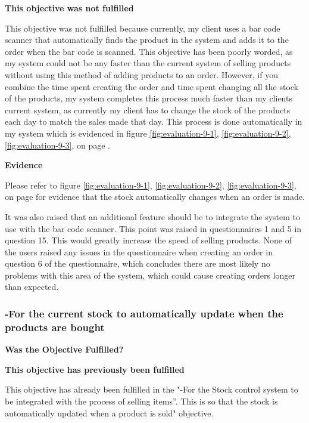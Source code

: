 \textbf{\large{This objective was not fulfilled}}

This objective was not fulfilled because currently, my client uses a bar code scanner that automatically finds the product in the system and adds it to the order when the bar code is scanned. This objective has been poorly worded, as my system could not be any faster than the current system of selling products without using this method of adding products to an order. However, if you combine the time spent creating the order and time spent changing all the stock of the products, my system completes this process much faster than my clients current system, as currently my client has to change the stock of the products each day to match the sales made that day. This process is done automatically in my system which is evidenced in figure \ref{fig:evaluation-9-1}, \ref{fig:evaluation-9-2}, \ref{fig:evaluation-9-3}, on  page \pageref{automatic-stock-evidence}. \newline

\textbf{Evidence} \newline

Please refer to figure \ref{fig:evaluation-9-1}, \ref{fig:evaluation-9-2}, \ref{fig:evaluation-9-3}, on  page \pageref{automatic-stock-evidence} for evidence that the stock automatically changes when an order is made.

It was also raised that an additional feature should be to integrate the system to use with the bar code scanner. This point was raised in questionnaires 1 and 5 in question 15. This would greatly increase the speed of selling products. None of the users raised any issues in the questionnaire when creating an order in question 6 of the questionnaire, which concludes there are most likely no problems with this area of the system, which could cause creating orders longer than expected.




\pagebreak
\subsubsection{-For the current stock to automatically update when the products are bought}
\textbf{Was the Objective Fulfilled?} \newline

\textbf{\large{This objective has previously been fulfilled}}

This objective has already been fulfilled in the "-For the Stock control system to be integrated with the process of selling items''. This is so that the stock is automatically updated when a product is sold" objective.

